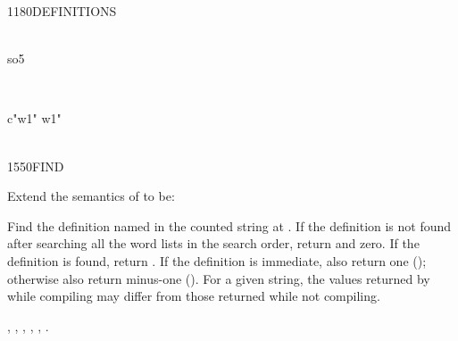 \begin{worddef}{1180}{DEFINITIONS}
\begin{testing}
		   \\
		\word{:} so5       \word{;}

		 \\

		\word{:} c"w1"  w1" \word{;} \\
		 \\
	\end{testing}
\end{worddef}


\begin{worddef}{1550}{FIND}
\item Extend the semantics of  to be:


	Find the definition named in the counted string at .
	If the definition is not found after searching all the word lists
	in the search order, return  and zero. If
	the definition is found, return . If the definition is
	immediate, also return one (); otherwise also return
	minus-one (). For a given string, the values returned
	by  while compiling may differ from those returned
	while not compiling.

\see {},
	,
	,
	,
	,
	.

	\begin{implement} %


\end{implement}
\end{worddef}
